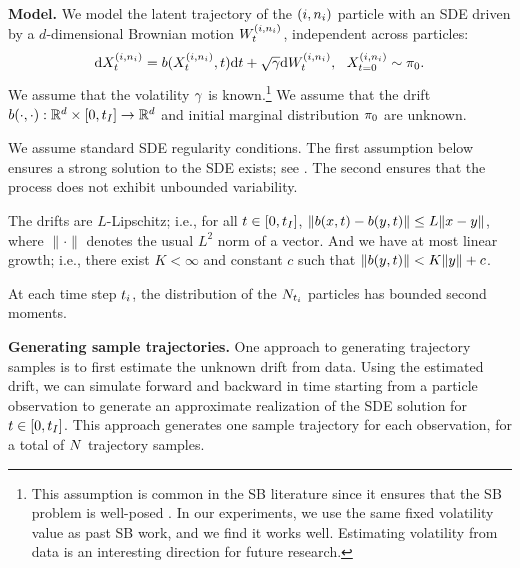 \textbf{Model.}
We model the latent trajectory of the $(i, n_{i})$ particle with an SDE driven by a $d$-dimensional Brownian motion $\brownianm^{ (\timeidx,\sampleidx_{\timeidx}) }$, independent across particles:
\begin{equation}
    \de\responseat{\timet}^{(\timeidx, \sampleidx_{\timeidx}) } = \modeldrift(\responseat{\timet}^{ (\timeidx,\sampleidx_{\timeidx}) },t) \de\timet + \sqrt\volatility \de\brownianm^{ (\timeidx,\sampleidx_{\timeidx}) },~~\responseat{\timet = 0}^{ (\timeidx,\sampleidx_{\timeidx}) }\sim \marginal{0}.
    \label{eq:mainsde}
\end{equation}
We assume that the volatility $\gamma$ is known.\footnote{This assumption is common in the SB literature since it ensures that the SB problem is well-posed \citep{Chen2022, Vargas2021, lavenant2024toward}. In our experiments, we use the same fixed volatility value as past SB work, and we find it works well. Estimating volatility from data is an interesting direction for future research.} We assume that the drift $\modeldrift(\cdot,\cdot): \R^{d}\times [0,\timet_{\totsteps}] \to \R^{d}$ and initial marginal distribution $\pi_{0}$ are unknown.

We assume standard SDE regularity conditions. The first assumption below ensures a strong solution to the SDE exists; see \citet[][Chapter 3, Theorem 3.1]{pavliotis2016stochastic}. The second ensures that the process does not exhibit unbounded variability.
\begin{assumption}
\label{assumption-lipschitz}
The drifts are $L$-Lipschitz; i.e., for all $t\in [0,t_{I}]$, $\|\modeldrift(x, t)-\modeldrift(y, t)\| \le L \| x-y \|$, where $\|\cdot \|$ denotes the usual $L^2$ norm of a vector. And we have at most linear growth; i.e., there exist $K<\infty$ and constant $c$ such that $\| \modeldrift(y, t)\| <K \| y \|+c$. 
\end{assumption} 
\begin{assumption}
\label{assumption-bddsecondmoments}
At each time step $t_{i}$, the distribution of the $N_{t_{i}}$ particles has bounded second moments.
\end{assumption}

\textbf{Generating sample trajectories.} One approach to generating trajectory samples is to first estimate the unknown drift from data. Using the estimated drift, we can simulate forward and backward in time starting from a particle observation to generate an approximate realization of the SDE solution for $t \in [0,t_{I}]$. This approach generates one sample trajectory for each observation, for a total of $N$ trajectory samples.

